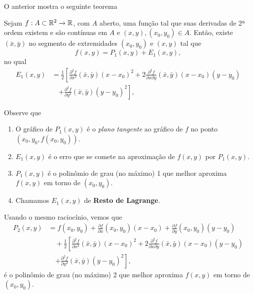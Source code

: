 O anterior mostra o seguinte teorema
\begin{theorem}
    Sejam \(f:A\subset\mathbb{R}^2\to\mathbb{R}\), com \(A\) aberto, uma função tal que suas derivadas de 2ª ordem existem e são contínuas em \(A\) e \((x,y),(x_0,y_0)\in A\). Então, existe \((\bar{x},\bar{y})\) no segmento de extremidades \((x_0,y_0)\) e \((x,y)\) tal que \[f(x,y) = P_1(x,y) + E_1(x,y),\] no qual 
        \begin{align*}
        E_1(x,y) 
            & = \frac{1}{2}\left[ \frac{\partial^2 f}{\partial x^2}(\bar{x},\bar{y})(x-x_0)^2 + 2\frac{\partial^2 f}{\partial x \partial y}(\bar{x},\bar{y})(x-x_0)(y-y_0) \right.\\
            & \quad \left. + \frac{\partial^2 f}{\partial y^2}(\bar{x},\bar{y})(y-y_0)^2 \right],
    \end{align*}
\end{theorem}

\begin{remark}
    Observe que
        \begin{enumerate}
            \item O gráfico de \(P_1(x,y)\) é o \textit{plano tangente} ao gráfico de \(f\) no ponto \((x_0,y_0,f(x_0,y_0))\).
            \item \(E_1(x,y)\) é o erro que se comete na aproximação de \(f(x,y)\) por \(P_1(x,y)\).
            \item \(P_1(x,y)\) é o polinômio de grau (no máximo) 1 que melhor aproxima \(f(x,y)\) em torno de \((x_0,y_0)\).
            \item Chamamos \(E_1(x,y)\) de \textbf{Resto de Lagrange}.
        \end{enumerate}
\end{remark}

Usando o mesmo raciocínio, vemos que
    \begin{align*}
        P_2(x,y) 
            & = f(x_0,y_0) + \frac{\partial f}{\partial x}(x_0,y_0)(x-x_0) + \frac{\partial f}{\partial y}(x_0,y_0)(y-y_0) \\
                &\quad + \frac{1}{2}\left[ \frac{\partial^2 f}{\partial x^2}(\bar{x},\bar{y})(x-x_0)^2 + 2\frac{\partial^2 f}{\partial x \partial y}(\bar{x},\bar{y})(x-x_0)(y-y_0) \right.\\
                &\quad \left. + \frac{\partial^2 f}{\partial y^2}(\bar{x},\bar{y})(y-y_0)^2 \right],
    \end{align*}
é o polinômio de grau (no máximo) 2 que melhor aproxima \(f(x,y)\) em torno de \((x_0,y_0)\).

